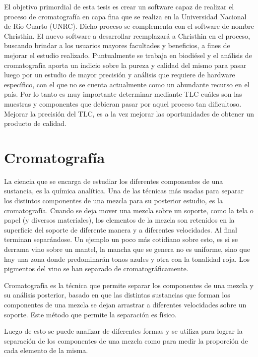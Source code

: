 El objetivo primordial de esta tesis es crear un software capaz de realizar el proceso de cromatograf\'ia en capa fina que se realiza en la Universidad Nacional de R\'io Cuarto (UNRC). Dicho proceso se complementa con el software de nombre Christhin. El nuevo software a desarrollar reemplazar\'a a Christhin en el proceso, buscando brindar a los usuarios mayores facultades y beneficios, a fines de mejorar el estudio realizado. Puntualmente se trabaja en biodi\'esel y el an\'alisis de cromatograf\'ia aporta un indicio sobre la pureza y calidad del mismo para pasar luego por un estudio de mayor precisi\'on y an\'alisis que requiere de hardware espec\'ifico, con el que no se cuenta actualmente como un abundante recurso en el pa\'is. Por lo tanto es muy importante determinar mediante TLC cu\'ales son las muestras y componentes que debieran pasar por aquel proceso tan dificultoso. Mejorar la precisi\'on del TLC, es a la vez mejorar las oportunidades de obtener un producto de calidad.

\clearpage

\section{Cromatograf\'ia}

La ciencia que se encarga de estudiar los diferentes componentes de una sustancia, es la qu\'imica anal\'itica. Una de las t\'ecnicas m\'as usadas para separar los distintos componentes de una mezcla para su posterior estudio, es la cromatograf\'ia. Cuando se deja mover una mezcla sobre un soporte, como la tela o papel (y diversos materiales), los elementos de la mezcla son retenidos en la superficie del soporte de diferente manera y a diferentes velocidades. Al final terminan separ\'andose. Un ejemplo un poco m\'as cotidiano sobre esto, es si se derrama vino sobre un mantel, la mancha que se genera no es uniforme, sino que hay una zona donde predominar\'an tonos azules y otra con la tonalidad roja. Los pigmentos del vino se han separado de cromatogr\'aficamente. 

Cromatograf\'ia es la t\'ecnica que permite separar los componentes de una mezcla y su an\'alisis posterior, basado en que las distintas sustancias que forman los componentes de una mezcla se dejan arrastrar a diferentes velocidades sobre un soporte. Este m\'etodo que permite la separaci\'on es f\'isico.

Luego de esto se puede analizar de diferentes formas y se utiliza para lograr la separaci\'on de los componentes de una mezcla como para medir la proporci\'on de cada elemento de la misma.
